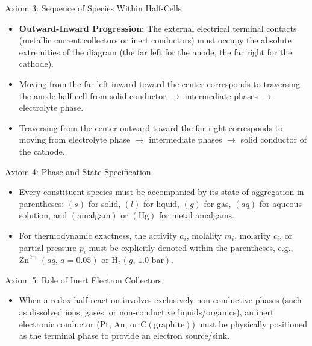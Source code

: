 \documentclass[10pt,a4paper]{article}
\begin{document}
\begin{rulebox}{Axiom 3: Sequence of Species Within Half-Cells}
\begin{itemize}[leftmargin=*]
    \item \textbf{Outward-Inward Progression:} The external electrical terminal contacts (metallic current collectors or inert conductors) must occupy the absolute extremities of the diagram (the far left for the anode, the far right for the cathode).
    \item Moving from the far left inward toward the center corresponds to traversing the anode half-cell from solid conductor $\rightarrow$ intermediate phases $\rightarrow$ electrolyte phase.
    \item Traversing from the center outward toward the far right corresponds to moving from electrolyte phase $\rightarrow$ intermediate phases $\rightarrow$ solid conductor of the cathode.
\end{itemize}
\end{rulebox}

\begin{rulebox}{Axiom 4: Phase and State Specification}
\begin{itemize}[leftmargin=*]
    \item Every constituent species must be accompanied by its state of aggregation in parentheses: $(s)$ for solid, $(l)$ for liquid, $(g)$ for gas, $(aq)$ for aqueous solution, and $(\text{amalgam})$ or $(\text{Hg})$ for metal amalgams.
    \item For thermodynamic exactness, the activity $a_i$, molality $m_i$, molarity $c_i$, or partial pressure $p_i$ must be explicitly denoted within the parentheses, e.g., $\text{Zn}^{2+}(aq,\, a=0.05)$ or $\text{H}_2(g,\, 1.0\text{ bar})$.
\end{itemize}
\end{rulebox}

\begin{rulebox}{Axiom 5: Role of Inert Electron Collectors}
\begin{itemize}[leftmargin=*]
    \item When a redox half-reaction involves exclusively non-conductive phases (such as dissolved ions, gases, or non-conductive liquids/organics), an inert electronic conductor ($\text{Pt}$, $\text{Au}$, or $\text{C}(\text{graphite})$) must be physically positioned as the terminal phase to provide an electron source/sink.
\end{itemize}
\end{rulebox}
\end{document}
